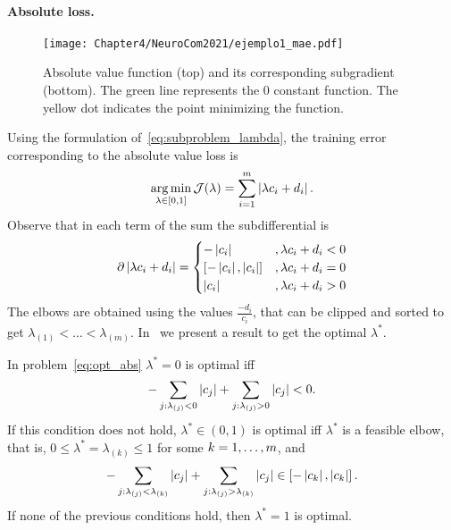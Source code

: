 \paragraph*{Absolute loss.\\}
\begin{figure}[t!]
    \centering
    \texttt{[image: Chapter4/NeuroCom2021/ejemplo1\_mae.pdf]}
    \caption{Absolute value function (top) and its corresponding subgradient (bottom). The green line represents the $0$ constant function. The yellow dot indicates the point minimizing the function.}
    \label{fig:abs_loss}
\end{figure}
Using the formulation of~\eqref{eq:subproblem_lambda}, the training error corresponding to the absolute value loss is
\begin{equation}
    \label{eq:opt_abs}
    \argmin_{\lambda \in [0, 1]} \mathcal{J}(\lambda) = \sum_{i=1}^{\npertask} \abs{\lambda c_i + d_i}.
\end{equation}
Observe that in each term of the sum the subdifferential is 
\begin{align*}
    \partial \abs{\lambda c_i + d_i} = 
    \begin{cases}
        -\abs{c_i} &, \lambda c_i + d_i  < 0 \\
        [-\abs{c_i}, \abs{c_i}] &, \lambda c_i + d_i  = 0 \\
        \abs{c_i} &, \lambda c_i + d_i  > 0 \\
    \end{cases} 
\end{align*}
The elbows are obtained using the values $\frac{-d_i}{c_i}$, that can be clipped and sorted to get ${\lambda}_{(1)} < \ldots < {\lambda}_{(m)}$.
In~\citet[Proposition 2]{RuizAD21} we present a result to get the optimal $\lambda^*$.
\begin{prop}\label{prop:abs_neurocom2020}
    In problem~\eqref{eq:opt_abs} $\lambda^*=0$ is optimal iff
    \begin{equation}\nonumber
        - \sum_{j: \lambda_{(j)} < 0} \left|c_{j}\right| + \sum_{j: \lambda_{(j)} > 0} \left|c_{j}\right| < 0.
        \end{equation}
    If this condition does not hold, $\lambda^* \in (0,1)$ is optimal iff $\lambda^*$ is a feasible elbow, that is, $0 \leq \lambda^* = \lambda_{(k)} \leq 1$ for some $k=1, \dotsc, m$, and
    \begin{equation}\label{sol_abs_e}
    - \sum_{j: \lambda_{(j)} < \lambda_{(k)}} \abs{c_{j}} + \sum_{j: \lambda_{(j)} > \lambda_{(k)}} \abs{c_{j}} \in \left[ -  \abs{c_{k}},  \abs{c_{k}}  \right] .
    \end{equation}
    If none of the previous conditions hold, then $\lambda^*=1$ is optimal.
\end{prop}

